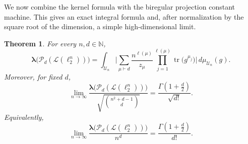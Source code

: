 \documentclass[11pt,showkeys]{amsart}
\newtheorem{theorem}{Theorem}[section]
\begin{document}
We now combine the kernel formula with the biregular projection constant
machine. This gives an exact integral formula and, after normalization by
the square root of the dimension, a simple high-dimensional limit.

\begin{theorem}
\label{thm:unitary-projection-asymptotic}
For every \(n,d\in\mathbb N\),
\[
        \boldsymbol\lambda\bigl(\mathcal P_d(\mathcal L(\ell_2^n))\bigr)
        =
        \int_{\mathcal U_n}
        \Bigg|
        \sum_{\mu\vdash d}
        \frac{n^{\ell(\mu)}}{z_\mu}
        \prod_{j=1}^{\ell(\mu)}
        \operatorname{tr}\bigl(g^{\mu_j}\bigr)
        \Bigg|
        \,d\mu_{\mathcal U_n}(g).
\]
Moreover, for fixed \(d\),
\[
        \lim_{n\to\infty}
        \frac{
        \boldsymbol\lambda\bigl(\mathcal P_d(\mathcal L(\ell_2^n))\bigr)}
        {\sqrt{\binom{n^2+d-1}{d}}}
        =
        \frac{\Gamma\left(1+\frac d2\right)}{\sqrt{d!}}.
\]
Equivalently,
\[
        \lim_{n\to\infty}
        \frac{
        \boldsymbol\lambda\bigl(\mathcal P_d(\mathcal L(\ell_2^n))\bigr)}
        {n^d}
        =
        \frac{\Gamma\left(1+\frac d2\right)}{d!}.
        \]
\end{theorem}
\end{document}
